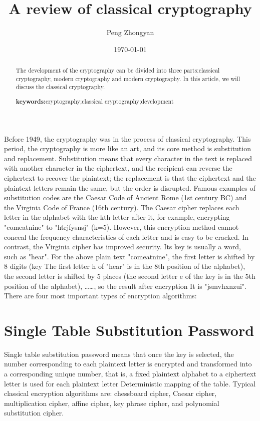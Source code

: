 \documentclass{article}
\title{A review of classical cryptography}
\author{Peng Zhongyan}
\date{\today}
\begin{document}
\maketitle

\begin{abstract}
The development of the cryptography can be divided into three parts:classical cryptography, modern cryptography and modern cryptography. In this article, we will discuss the classical cryptography.
\par\textbf{keywords:}cryptography;classical cryptography;development
\end{abstract}


\newpage
Before 1949, the cryptography was in the process of classical cryptography. This period, the cryptography is more like an art, and its core method is substitution and replacement. Substitution means that every character in the text is replaced with another character in the ciphertext, and the recipient can reverse the ciphertext to recover the plaintext; the replacement is that the ciphertext and the plaintext letters remain the same, but the order is disrupted. Famous examples of substitution codes are the Caesar Code of Ancient Rome (1st century BC) and the Virginia Code of France (16th century). The Caesar cipher replaces each letter in the alphabet with the kth letter after it, for example, encrypting "comeatnine" to "htrjfysnsj" (k=5). However, this encryption method cannot conceal the frequency characteristics of each letter and is easy to be cracked. In contrast, the Virginia cipher has improved security. Its key is usually a word, such as "hear". For the above plain text "comeatnine", the first letter is shifted by 8 digits (key The first letter h of "hear" is in the 8th position of the alphabet), the second letter is shifted by 5 places (the second letter e of the key is in the 5th position of the alphabet), ……, so the result after encryption It is "jsmvhxnzui".\\

There are four most important types of encryption algorithms:


\section{Single Table Substitution Password}


Single table substitution password means that once the key is selected, the number corresponding to each plaintext letter is encrypted and transformed into a corresponding unique number, that is, a fixed plaintext alphabet to a ciphertext letter is used for each plaintext letter Deterministic mapping of the table. Typical classical encryption algorithms are: chessboard cipher, Caesar cipher, multiplication cipher, affine cipher, key phrase cipher, and polynomial substitution cipher.\\
\end{document}

